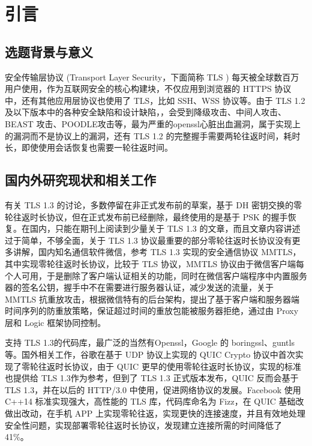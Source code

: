 \section{引言}

\subsection{选题背景与意义}
\label{sec:background}
  安全传输层协议 (Transport Layer Security，下面简称 TLS ) 每天被全球数百万用户使用，作为互联网安全的核心构建块，不仅应用到浏览器的 HTTPS 协议中，还有其他应用层协议也使用了 TLS，比如 SSH、WSS 协议等。由于 TLS 1.2 及以下版本中的各种安全缺陷和设计缺陷\cite{7877537}，\cite{8632026}，会受到降级攻击、中间人攻击、BEAST 攻击、POODLE攻击等，最为严重的openssl心脏出血漏洞\cite{8001980}，属于实现上的漏洞而不是协议上的漏洞，还有 TLS 1.2 的完整握手需要两轮往返时间，耗时长，即使使用会话恢复也需要一轮往返时间。
  
\subsection{国内外研究现状和相关工作}
\label{sec:related_work}
  有关 TLS 1.3 的讨论，多数停留在非正式发布前\cite{7883842}\cite{ARTICLE_typical1}\cite{ARTICLE_typical}的草案，基于 DH 密钥交换的零轮往返时长协议，但在正式发布前已经删除，最终使用的是基于 PSK 的握手恢复。在国内，只能在期刊上阅读到少量关于 TLS 1.3 的文章，而且文章内容讲述过于简单，不够全面，关于 TLS 1.3 协议最重要的部分零轮往返时长协议没有更多讲解，国内知名通信软件微信，参考 TLS 1.3 实现的安全通信协议 MMTLS\cite{MMTLS}，其中实现零轮往返时长协议，比较于 TLS 协议，MMTLS 协议由于微信客户端每个人可用，于是删除了客户端认证相关的功能，同时在微信客户端程序中内置服务器的签名公钥，握手中不在需要进行服务器认证，减少发送的流量，关于 MMTLS 抗重放攻击，根据微信特有的后台架构，提出了基于客户端和服务器端时间序列的防重放策略，保证超过时间的重放包能被服务器拒绝，通过由 Proxy 层和 Logic 框架协同控制。
  
  支持 TLS 1.3的代码库，最广泛的当然有Openssl，Google 的 boringssl、guntls 等。国外相关工作，谷歌在基于 UDP 协议上实现的 QUIC Crypto 协议\cite{8280429}中首次实现了零轮往返时长协议，由于 QUIC 更早的使用零轮往返时长协议，实现的标准也提供给 TLS 1.3作为参考，但到了 TLS 1.3 正式版本发布，QUIC 反而会基于 TLS 1.3，并在以后的 HTTP/3.0 中使用，促进网络协议的发展。Facebook 使用 C++14 标准实现强大，高性能的 TLS 库，代码库命名为 Fizz，在 QUIC 基础改做出改动，在手机 APP 上实现零轮往返，实现更快的连接速度，并且有效地处理安全性问题，实现部署零轮往返时长协议，发现建立连接所需的时间降低了 41\%。
  
